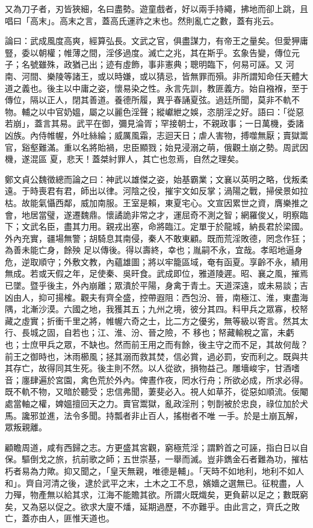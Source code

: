 \begin{pinyinscope}
 又為刀子者，刃皆狹細，名曰盡勢。遊童戲者，好以兩手持繩，拂地而卻上跳，且唱曰「高末」。高末之言，蓋高氏運祚之末也。然則亂亡之數，蓋有兆云。



 論曰：武成風度高爽，經算弘長。文武之官，俱盡謀力，有帝王之量矣。但愛狎庸豎，委以朝權；帷薄之間，淫侈過度。滅亡之兆，其在斯乎。玄象告變，傳位元子；名號雖殊，政猶己出；迹有虛飾，事非憲典；聰明臨下，何易可誣。又
 河南、河間、樂陵等諸王，或以時嫌，或以猜忌，皆無罪而殞。非所謂知命任天體大道之義也。後主以中庸之姿，懷易染之性。永言先訓，教匪義方。始自襁褓，至于傳位，隔以正人，閉其善道。養德所履，異乎春誦夏弦。過廷所聞，莫非不軌不物。輔之以中官奶媼，屬之以麗色淫聲；縱巘紲之娛，恣朋淫之好。語曰：「從惡若崩」，蓋言其易。武平在御，彌見淪胥；罕接朝士，不親政事；一日萬機，委諸凶族。內侍帷幄，外吐絲綸；威厲風霜，志迴天日；虐人害物，搏噬無厭；賣獄鬻官，谿壑難滿。重以名將貽禍，忠臣顯戮；始見浸溺之萌，俄觀土崩之勢。周武因機，遂混區
 夏，悲天！蓋桀紂罪人，其亡也忽焉，自然之理矣。



 鄭文貞公魏徵總而論之曰：神武以雄傑之姿，始基霸業；文襄以英明之略，伐叛柔遠。于時喪君有君，師出以律。河陰之役，摧宇文如反掌；渦陽之戰，掃侯景如拉枯。故能氣懾西鄰，威加南服。王室是賴，東夏宅心。文宣因累世之資，膺樂推之會，地居當璧，遂遷魏鼎。懷譎詭非常之才，運屈奇不測之智；網羅俊乂，明察臨下；文武名臣，盡其力用。親戎出塞，命將臨江。定單于於龍城，納長君於梁國。外內充實，疆場無警；胡騎息其南侵，秦人不敢東顧。既而荒淫敗德，罔念作狂；為善未能亡身，餘殃
 足以傳後。得以壽終，幸也；胤嗣不永，宜哉。孝昭地逼身危，逆取順守；外敷文教，內蘊雄圖；將以牢籠區域，奄有函夏。享齡不永，績用無成。若或天假之年，足使秦、吳旰食。武成即位，雅道陵遲。昭、襄之風，摧焉已墜。暨乎後主，外內崩離；眾潰於平陽，身禽于青土。天道深遠，或未易談；吉凶由人，抑可揚榷。觀夫有齊全盛，控帶遐阻：西包汾、晉，南極江、淮，東盡海隅，北漸沙漠。六國之地，我獲其五；九州之境，彼分其四。料甲兵之眾寡，校帑藏之虛實；折衝千里之將，帷幄六奇之士，比二方之優劣，無等級以寄言。然其太行、長城之固，自若也；江、淮、汾、晉之險，不
 移也；帑藏輸稅之富，未虧也；士庶甲兵之眾，不缺也。然而前王用之而有餘，後主守之而不足，其故何哉？前王之御時也，沐雨櫛風；拯其溺而救其焚，信必賞，過必罰，安而利之。既與共其存亡，故得同其生死。後主則不然。以人從欲，損物益己。雕墻峻宇，甘酒嗜音；廛肆遍於宮園，禽色荒於外內。俾晝作夜，罔水行舟；所欲必成，所求必得。既不軌不物，又暗於聽受；忠信弗聞，萋斐必入。視人如草芥，從惡如順流。佞閹處當軸之權，婢媼擅回天之力。賣官鬻獄，亂政淫刑；刳剒被於忠良，祿位加於犬馬。讒邪並進，法令多聞。持瓢者非止百人，搖樹者不唯
 一手。於是土崩瓦解，眾叛親離。



 顧瞻周道，咸有西歸之志。方更盛其宮觀，窮極荒淫；謂黔首之可誣，指白日以自保。驅倒戈之旅，抗前歌之師；五世崇基，一舉而滅。豈非鐫金石者難為功，摧枯朽者易為力歟。抑又聞之，「皇天無親，唯德是輔」。「天時不如地利，地利不如人和」。齊自河清之後，逮於武平之末，土木之工不息，嬪嬙之選無已。征稅盡，人力殫，物產無以給其求，江海不能贍其欲。所謂火既熾矣，更負薪以足之；數既窮矣，又為惡以促之。欲求大廈不燔，延期過歷，不亦難乎。由此言之，齊氏之敗亡，蓋亦由人，匪惟天道也。



\end{pinyinscope}